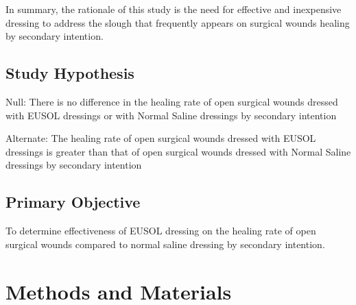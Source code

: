 \documentclass{article}
\begin{document}
In summary, the rationale of this study is the need for effective and
inexpensive dressing to address the slough that frequently appears on surgical
wounds healing by secondary intention.

\subsection{Study Hypothesis}
Null: There is no difference in the healing rate of open surgical wounds
dressed with EUSOL dressings or with Normal Saline dressings by
secondary intention

Alternate: The healing rate of open surgical wounds dressed with EUSOL
dressings is greater than that of open surgical wounds dressed with
Normal Saline dressings by secondary intention

\subsection{Primary Objective}
To determine effectiveness of EUSOL dressing on the healing rate of open
surgical wounds compared to normal saline dressing by secondary
intention.

\section{Methods and Materials}
\end{document}

